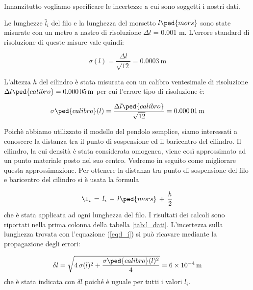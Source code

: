 \label{l_medie}

Innanzitutto vogliamo specificare le incertezze a cui sono soggetti i nostri dati.

Le lunghezze $\bar{l}_i$ del filo e la lunghezza del morsetto $l\ped{mors}$ sono state misurate con un metro a nastro di risoluzione
$\Delta l$ = 0.001 m. L'errore standard di risoluzione di queste misure vale quindi:

\begin{equation}
    \sigma(l) = \frac{\Delta l}{\sqrt{12}} = \SI{0.0003}{\metre}
\end{equation}

L'altezza $h$ del cilindro è stata misurata con un calibro ventesimale di risoluzione $\Delta l\ped{calibro} = \SI{0.00005}{\meter}$
per cui l'errore tipo di risoluzione è:

\begin{equation}
    \sigma\ped{calibro}(l) = \frac{\Delta l\ped{calibro}}{\sqrt{12}} = \SI{0.00001}{\metre}
\end{equation}

Poichè abbiamo utilizzato il modello del pendolo semplice, siamo interessati a conoscere la distanza tra il punto
di sospensione ed il baricentro del cilindro. Il cilindro, la cui densità è stata considerata omogenea,
viene così approssimato ad un punto materiale posto nel suo centro. Vedremo in seguito come migliorare questa approssimazione.
Per ottenere la distanza tra punto di sospensione del filo e baricentro del cilindro si è usata la formula

\begin{equation}
	\l_i \,=\, \bar{l}_i \,-\, l\ped{mors} \,+\, \frac{h}{2}
    \label{eq:l_i}
\end{equation}
%
che è stata applicata ad ogni lunghezza del filo. I risultati dei calcoli sono riportati nella prima colonna
della tabella \ref{tab:l_dati}. L'incertezza sulla lunghezza trovata con l'equazione (\ref{eq:l_i}) si può ricavare mediante la propagazione
degli errori:

\begin{equation}
	\delta l = \sqrt{4\,\sigma(l)^2 + \frac{\sigma\ped{calibro}(l)^2}{4}} = \SI{6e-4}{m}
\end{equation}
%
che è stata indicata con $\delta l$ poiché è uguale per tutti i valori $l_i$.

